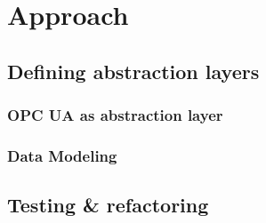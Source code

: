 \chapter{Approach}
\section{Defining abstraction layers}
\subsection{OPC UA as abstraction layer}
\subsection{Data Modeling}
\section{Testing \& refactoring}